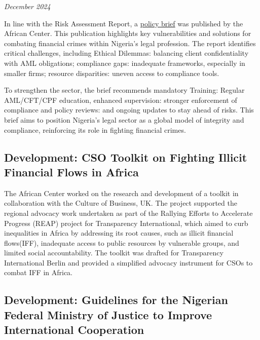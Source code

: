 \documentclass[
  letterpaper,
  DIV=11,
  numbers=noendperiod]{scrreprt}
\begin{document}
\emph{December 2024}

In line with the Risk Assessment Report, a
\href{https://africancenterdev.org/policy-brief-on-the-nigerian-legal-sector-aml-cft-pf-risk-assessment}{policy
brief} was published by the African Center. This publication highlights
key vulnerabilities and solutions for combating financial crimes within
Nigeria's legal profession. The report identifies critical challenges,
including Ethical Dilemmas: balancing client confidentiality with AML
obligations; compliance gaps: inadequate frameworks, especially in
smaller firms; resource disparities: uneven access to compliance tools.

To strengthen the sector, the brief recommends mandatory Training:
Regular AML/CFT/CPF education, enhanced supervision: stronger
enforcement of compliance and policy reviews: and ongoing updates to
stay ahead of risks. This brief aims to position Nigeria's legal sector
as a global model of integrity and compliance, reinforcing its role in
fighting financial crimes.

\subsection{Development: CSO Toolkit on Fighting Illicit Financial Flows
in
Africa}\label{development-cso-toolkit-on-fighting-illicit-financial-flows-in-africa}

The African Center worked on the research and development of a toolkit
in collaboration with the Culture of Business, UK. The project supported
the regional advocacy work undertaken as part of the Rallying Efforts to
Accelerate Progress (REAP) project for Transparency International, which
aimed to curb inequalities in Africa by addressing its root causes, such
as illicit financial flows(IFF), inadequate access to public resources
by vulnerable groups, and limited social accountability. The toolkit was
drafted for Transparency International Berlin and provided a simplified
advocacy instrument for CSOs to combat IFF in Africa.

\subsection{Development: Guidelines for the Nigerian Federal Ministry of
Justice to Improve International
Cooperation}\label{development-guidelines-for-the-nigerian-federal-ministry-of-justice-to-improve-international-cooperation}
\end{document}
